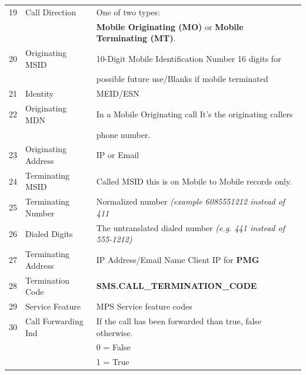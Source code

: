 \documentclass[12pt,twoside]{article}
\begin{document}
\begin{longtable}{cll}
             19  &  Call Direction           &  One of two types:                                                      \\
                 &                           &  \textbf{Mobile Originating (MO)} or \textbf{Mobile Terminating (MT)}.  \\
             20  &  Originating MSID         &  10-Digit Mobile Identification Number 16 digits for                    \\
                 &                           &  possible future use/Blanks if mobile terminated                        \\
             21  &  Identity                 &  MEID/ESN                                                               \\
             22  &  Originating MDN          &  In a Mobile Originating call It's the originating callers              \\
                 &                           &  phone number.                                                          \\
             23  &  Originating Address      &  IP or Email                                                            \\
             24  &  Terminating MSID         &  Called MSID this is on Mobile to Mobile records only.                  \\
             25  &  Terminating Number       &  Normalized number \emph{(example 6085551212 instead of 411}            \\
             26  &  Dialed Digits            &  The untranslated dialed number \emph{(e.g. 441 instead of 555-1212)}   \\
             27  &  Terminating Address      &  IP Address/Email Name Client IP for \textbf{PMG}                       \\
             28  &  Termination Code         &  \textbf{SMS.CALL\_TERMINATION\_CODE}                                   \\
             29  &  Service Feature          &  MPS Service feature codes                                              \\
             30  &  Call Forwarding Ind      &  If the call has been forwarded than true, false otherwise.             \\
                 &                           &  0 = False                                                              \\
                 &                           &  1 = True                                                               \\

\end{longtable}
\end{document}
